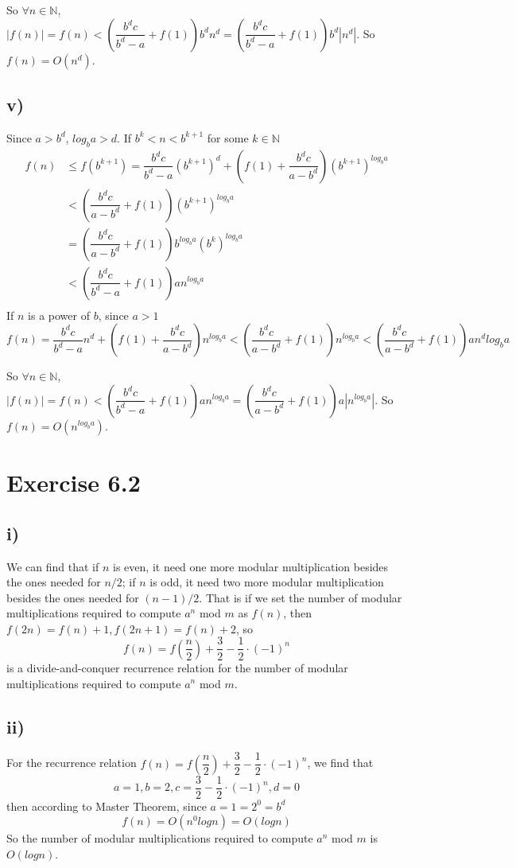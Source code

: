 \documentclass[a4paper,12pt,titlepage]{article}
\begin{document}
So $\forall n\in\mathbb{N}$, $|f(n)|=f(n)<(\dfrac{b^dc}{b^d-a}+f(1))b^dn^d=(\dfrac{b^dc}{b^d-a}+f(1))b^d|n^d|$. So $f(n)=O(n^d)$.


\subsection*{v)}
Since $a>b^d$, $log_ba>d$.
If $b^k<n<b^{k+1}$ for some $k\in\mathbb{N}$
\begin{align*}
f(n)&\leqslant f(b^{k+1})=\dfrac{b^dc}{b^d-a}(b^{k+1})^d+(f(1)+\dfrac{b^dc}{a-b^d})(b^{k+1})^{log_ba}\\
&<(\dfrac{b^dc}{a-b^d}+f(1))(b^{k+1})^{log_ba}\\
&=(\dfrac{b^dc}{a-b^d}+f(1))b^{log_ba}(b^{k})^{log_ba}\\
&<(\dfrac{b^dc}{b^d-a}+f(1))an^{log_ba}\\
\end{align*}
If $n$ is a power of $b$, since $a>1$
$$f(n)=\dfrac{b^dc}{b^d-a}n^d+(f(1)+\dfrac{b^dc}{a-b^d})n^{log_ba}<(\dfrac{b^dc}{a-b^d}+f(1))n^{log_ba}<(\dfrac{b^dc}{a-b^d}+f(1))an^d{log_ba}$$

So $\forall n\in\mathbb{N}$, $|f(n)|=f(n)<(\dfrac{b^dc}{b^d-a}+f(1))an^{log_ba}=(\dfrac{b^dc}{a-b^d}+f(1))a|n^{log_ba}|$. So $f(n)=O(n^{log_ba})$.


\section*{Exercise 6.2}
\subsection*{i)}
We can find that if $n$ is even, it need one more modular multiplication besides the ones needed for $n/2$; if $n$ is odd, it need two more modular multiplication besides the ones needed for $(n-1)/2$. That is if we set the number of modular multiplications required to compute $a^n$ mod $m$ as $f(n)$, then
$f(2n)=f(n)+1, f(2n+1)=f(n)+2$, so
$$f(n)=f(\dfrac{n}{2})+\dfrac{3}{2}-\dfrac{1}{2}\cdot (-1)^n$$
is a divide-and-conquer recurrence relation for the number of modular multiplications required to compute $a^n$ mod $m$.
\subsection*{ii)}
For the recurrence relation $f(n)=f(\dfrac{n}{2})+\dfrac{3}{2}-\dfrac{1}{2}\cdot (-1)^n$, we find that 
$$a=1,b=2,c=\dfrac{3}{2}-\dfrac{1}{2}\cdot (-1)^n,d=0$$
then according to Master Theorem, since $a=1=2^0=b^d$
$$f(n)=O(n^0logn)=O(logn)$$
So the number of modular multiplications required to compute $a^n$ mod $m$ is $O(logn)$.
\end{document}
